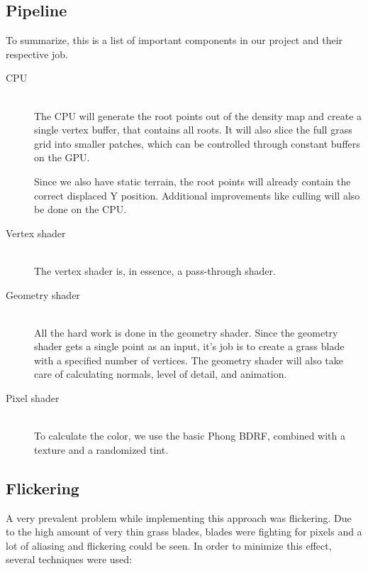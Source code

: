\documentclass[conference]{acmsiggraph}
\begin{document}
\subsection{Pipeline}
To summarize, this is a list of important components in our project and their respective job.
\begin{description}
  \item[CPU] \hfill \\
  The CPU will generate the root points out of the density map and create a single vertex buffer, that contains all roots. It will also slice the full grass grid into smaller patches, which can be controlled through constant buffers on the GPU.
  
  Since we also have static terrain, the root points will already contain the correct displaced Y position. Additional improvements like culling will also be done on the CPU.
  \item[Vertex shader] \hfill \\
  The vertex shader is, in essence, a pass-through shader.
  \item[Geometry shader] \hfill \\
  All the hard work is done in the geometry shader. Since the geometry shader gets a single point as an input, it's job is to create a grass blade with a specified number of vertices. The geometry shader will also take care of calculating normals, level of detail, and animation.
  \item[Pixel shader] \hfill \\
  To calculate the color, we use the basic Phong BDRF, combined with a texture and a randomized tint.
\end{description}

\subsection{Flickering}
A very prevalent problem while implementing this approach was flickering. Due to the high amount of very thin grass blades, blades were fighting for pixels and a lot of aliasing and flickering could be seen. In order to minimize this effect, several techniques were used:
\end{document}
